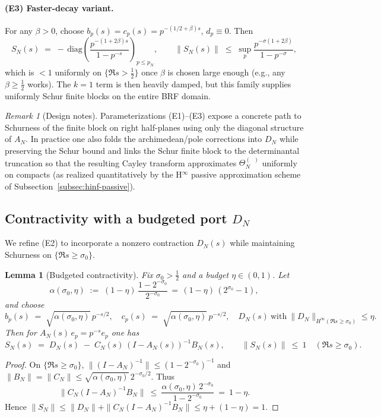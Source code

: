 \documentclass[11pt]{article}
\newtheorem{lemma}[theorem]{Lemma}
\theoremstyle{definition}
\theoremstyle{remark}
\newtheorem{remark}[theorem]{Remark}
\DeclareMathOperator{\dettwo}{det_2}
\begin{document}
\paragraph{(E3) Faster-decay variant.}
For any $\beta>0$, choose $b_p(s)=c_p(s)=p^{-(1/2+\beta)s}$, $d_p\equiv 0$. Then
\[
 S_N(s)\;=\;-\,\mathrm{diag}\!\left(\frac{p^{-(1+2\beta)s}}{1-p^{-s}}\right)_{p\le p_N},\qquad \|S_N(s)\|\;\le\;\sup_p\frac{p^{-\sigma(1+2\beta)}}{1-p^{-\sigma}},
\]
which is $<1$ uniformly on $\{\Re s>\tfrac12\}$ once $\beta$ is chosen large enough (e.g., any $\beta\ge \tfrac12$ works). The $k=1$ term is then heavily damped, but this family supplies uniformly Schur finite blocks on the entire BRF domain.

\begin{remark}[Design notes]
Parameterizations (E1)–(E3) expose a concrete path to Schurness of the finite block on right half-planes using only the diagonal structure of $A_N$. In practice one also folds the archimedean/pole corrections into $D_N$ while preserving the Schur bound and links the Schur finite block to the determinantal truncation so that the resulting Cayley transform approximates $\Theta_N^{(\dettwo)}$ uniformly on compacts (as realized quantitatively by the H$^\infty$ passive approximation scheme of Subsection~\ref{subsec:hinf-passive}).
\end{remark}

\subsection{Contractivity with a budgeted port $D_N$}\label{subsec:DN-budget}
We refine (E2) to incorporate a nonzero contraction $D_N(s)$ while maintaining Schurness on $\{\Re s\ge \sigma_0\}$.

\begin{lemma}[Budgeted contractivity]\label{lem:budget}
Fix $\sigma_0>\tfrac12$ and a budget $\eta\in(0,1)$. Let
\[
 \alpha(\sigma_0,\eta)\;:=\;(1-\eta)\,\frac{1-2^{-\sigma_0}}{2^{-\sigma_0}}\,=\,(1-\eta)\,(2^{\sigma_0}-1),
\]
and choose
\[
 b_p(s)\;=\;\sqrt{\alpha(\sigma_0,\eta)}\,p^{-s/2},\quad c_p(s)\;=\;\sqrt{\alpha(\sigma_0,\eta)}\,p^{-s/2},\quad D_N(s)\ \text{with}\ \|D_N\|_{H^\infty(\Re s\ge \sigma_0)}\le \eta.
\]
Then for $A_N(s)\,e_p=p^{-s}e_p$ one has
\[
 S_N(s)\;=\;D_N(s)\; -\; C_N(s)\,(I-A_N(s))^{-1}B_N(s),\qquad \|S_N(s)\|\ \le\ 1\quad (\Re s\ge \sigma_0).
\]
\end{lemma}
\begin{proof}
On $\{\Re s\ge \sigma_0\}$, $\|(I-A_N)^{-1}\|\le (1-2^{-\sigma_0})^{-1}$ and $\|B_N\|=\|C_N\|\le \sqrt{\alpha(\sigma_0,\eta)}\,2^{-\sigma_0/2}$. Thus
\[
 \|C_N(I-A_N)^{-1}B_N\|\ \le\ \frac{\alpha(\sigma_0,\eta)\,2^{-\sigma_0}}{1-2^{-\sigma_0}}\ =\ 1-\eta.
\]
Hence $\|S_N\|\le \|D_N\|+\|C_N(I-A_N)^{-1}B_N\|\le \eta+(1-\eta)=1$.
\end{proof}
\end{document}
